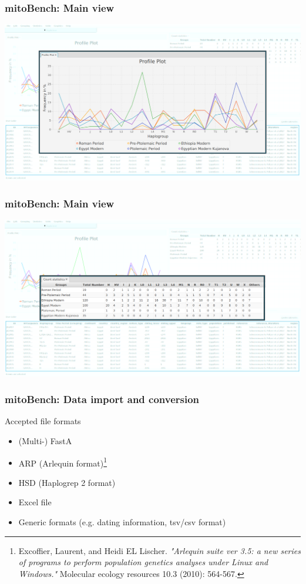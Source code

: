\documentclass{beamer} %
\begin{document}
\begin{frame}
	\frametitle{mitoBench: Main view}
	\begin{center}
		\includegraphics[width=1.0\textwidth]{imagesBench/main_plot2.png}
	\end{center}
\end{frame}

\begin{frame}
	\frametitle{mitoBench: Main view}
	\begin{center}
		\includegraphics[width=1.0\textwidth]{imagesBench/main_stats2.png}
	\end{center}
\end{frame}

\begin{frame}
\frametitle{mitoBench: Data import and conversion}
Accepted file formats
\begin{itemize}
\item (Multi-) FastA \pause
\item ARP (Arlequin format)\footnote{Excoffier, Laurent, and Heidi EL Lischer. \textit{"Arlequin suite ver 3.5: a new series of programs to perform population genetics analyses under Linux and Windows."} Molecular ecology resources 10.3 (2010): 564-567.} \pause
\item HSD (Haplogrep 2 format) \pause
\item Excel file \pause
\item Generic formats (e.g. dating information, tsv/csv format) 
\end{itemize}
\end{frame}
\end{document}
